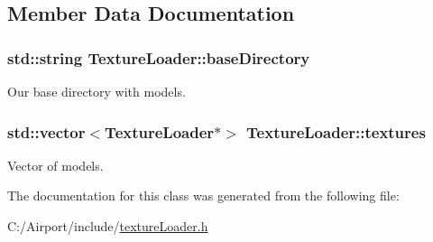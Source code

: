 \subsection{Member Data Documentation}
\subsubsection[{\texorpdfstring{base\+Directory}{baseDirectory}}]{\setlength{\rightskip}{0pt plus 5cm}std\+::string Texture\+Loader\+::base\+Directory\hspace{0.3cm}{\ttfamily [private]}}\hypertarget{class_texture_loader_acd647e9e5e5ca9b1ba8b3e6ef0aa9d84}{}\label{class_texture_loader_acd647e9e5e5ca9b1ba8b3e6ef0aa9d84}
Our base directory with models. 
\subsubsection[{\texorpdfstring{textures}{textures}}]{\setlength{\rightskip}{0pt plus 5cm}std\+::vector$<${\bf Texture\+Loader}$\ast$$>$ Texture\+Loader\+::textures\hspace{0.3cm}{\ttfamily [private]}}\hypertarget{class_texture_loader_a09fe47aeb3e99643cae0ebd7ad90a434}{}\label{class_texture_loader_a09fe47aeb3e99643cae0ebd7ad90a434}
Vector of models. 

The documentation for this class was generated from the following file\+:\begin{DoxyCompactItemize}
\item 
C\+:/\+Airport/include/\hyperlink{texture_loader_8h}{texture\+Loader.\+h}\end{DoxyCompactItemize}
